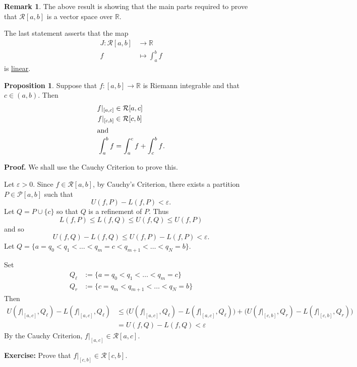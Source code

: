 \documentclass[11pt]{article}
\theoremstyle{definition}
\newtheorem{prop}[thm]{Proposition}
\newtheorem{remark}[thm]{Remark}
\newcommand{\mbR}{\ensuremath{\mathbb{R}}}
\begin{document}
\begin{remark}
The above result is showing that the main parts required to prove that $\mathcal{R}[a, b]$ is a vector space over $\mbR$. 

The last statement asserts that the map
\begin{align*}
J : \mathcal{R}[a, b] & \to \mbR \\
		f & \mapsto \int_a^b f
\end{align*}
is \underline{linear}.
\end{remark}

\begin{prop}
Suppose that $f : [a, b] \to \mbR$ is Riemann integrable and that $c \in (a, b)$. Then
\begin{align*}
f|_{[a, c]} & \in \mathcal{R}[a, c] \\
f|_{[c, b]} & \in \mathcal{R}[c, b] \\
\intertext{and}
\int_a^b f & = \int_a^c f + \int_c^b f \text{.}
\end{align*}
\end{prop}
\textbf{Proof.}
We shall use the Cauchy Criterion to prove this. 

Let $\varepsilon > 0$. Since $f \in \mathcal{R}[a, b]$, by Cauchy's Criterion, there exists a partition $P \in \mathcal{P}[a, b]$ such that
$$U(f, P) - L(f, P) < \varepsilon \text{.}$$
Let $Q = P \cup \{c\}$ so that $Q$ is a refinement of $P$. Thus
$$L(f, P) \leq L(f, Q) \leq U(f, Q) \leq U(f, P)$$
and so
$$U(f, Q) - L(f, Q) \leq U(f, P) - L(f, P) < \varepsilon \text{.}$$
Let $Q = \{a = q_0 < q_1 < \dots < q_m = c < q_{m+1} < \dots < q_N = b\}$. 

Set 
\begin{align*}
Q_{\ell} & := \{a = q_0 < q_1 < \dots < q_m = c\} \\
Q_r & := \{c = q_m < q_{m+1} < \dots < q_N = b\}
\end{align*}
Then
\begin{align*}
U(f|_{[a, c]}, Q_{\ell}) - L(f|_{[a, c]}, Q_{\ell}) 
& \leq \Big(U(f|_{[a, c]}, Q_{\ell}) - L(f|_{[a, c]}, Q_{\ell})\Big) + \Big(U(f|_{[c, b]}, Q_r) - L(f|_{[c, b]}, Q_r)\Big) \\
& = U(f, Q) - L(f, Q) < \varepsilon
\end{align*}
By the Cauchy Criterion, $f|_{[a, c]} \in \mathcal{R}[a, c]$. 

\textbf{Exercise:} Prove that $f|_{[c, b]} \in \mathcal{R}[c, b]$. 
\end{document}
